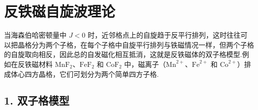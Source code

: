\section{反铁磁自旋波理论}

当海森伯哈密顿量中 $J<0$ 时，近邻格点上的自旋趋于反平行排列，这时往往可以把晶格分为两个子格，在每个子格中自旋平行排列与铁磁情况一样，但两个子格的自旋取向相反，因此总的自发磁化相互抵消，这就是反铁磁体的双子格模型.例如在反铁磁材料
$\mathrm{MnF}_2$、$\mathrm{FeF}_2$ 和 $\mathrm{CoF}_2$
中，磁离子（$\mathrm{Mn}^{2+}$、$\mathrm{Fe}^{2+}$ 和
$\mathrm{Co}^{2+}$）排成体心四方晶格，它们可划分为两个简单四方子格.

\subsection*{1. 双子格模型}

